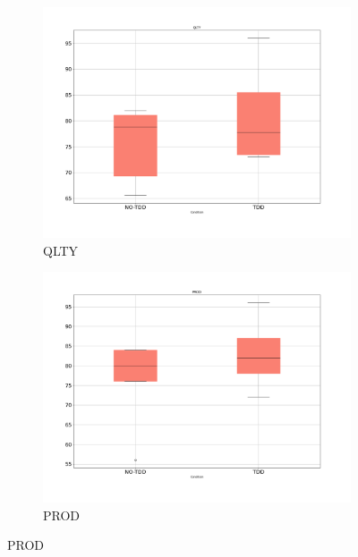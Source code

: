\begin{figure}[H]
    \centering
    \begin{subfigure}{0.5\textwidth}
        \includegraphics[width=\linewidth]{figures/box_plots/task1/QLTY.png}
        \caption{QLTY}
        \label{bp_task1_qlty}
    \end{subfigure}\hfil
    \begin{subfigure}{0.5\textwidth}
        \includegraphics[width=\linewidth]{figures/box_plots/task1/PROD.png}
        \caption{PROD}
        \label{bp_task1_prod}
    \end{subfigure}

    \medskip


\end{figure}
